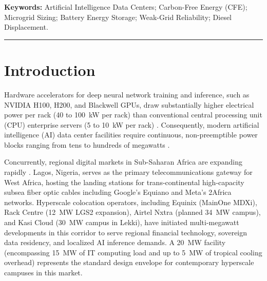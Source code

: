 \documentclass[11pt,a4paper]{article}
\begin{document}
\vspace{0.5em}
\noindent \textbf{Keywords:} Artificial Intelligence Data Centers; Carbon-Free Energy (CFE); Microgrid Sizing; Battery Energy Storage; Weak-Grid Reliability; Diesel Displacement.

\vspace{0.8em}
\noindent\rule{\textwidth}{0.4pt}

\section{Introduction}
\label{sec:intro}

Hardware accelerators for deep neural network training and inference, such as NVIDIA H100, H200, and Blackwell GPUs, draw substantially higher electrical power per rack (40 to 100~kW per rack) than conventional central processing unit (CPU) enterprise servers (5 to 10~kW per rack) \cite{Wu2022, Faiz2024}. Consequently, modern artificial intelligence (AI) data center facilities require continuous, non-preemptible power blocks ranging from tens to hundreds of megawatts \cite{AlTurjman2024, Narayanan2021}.

Concurrently, regional digital markets in Sub-Saharan Africa are expanding rapidly \cite{Mbate2024}. Lagos, Nigeria, serves as the primary telecommunications gateway for West Africa, hosting the landing stations for trans-continental high-capacity subsea fiber optic cables including Google's Equiano and Meta's 2Africa networks. Hyperscale colocation operators, including Equinix (MainOne MDXi), Rack Centre (12~MW LGS2 expansion), Airtel Nxtra (planned 34~MW campus), and Kasi Cloud (30~MW campus in Lekki), have initiated multi-megawatt developments in this corridor to serve regional financial technology, sovereign data residency, and localized AI inference demands. A 20~MW facility (encompassing 15~MW of IT computing load and up to 5~MW of tropical cooling overhead) represents the standard design envelope for contemporary hyperscale campuses in this market.
\end{document}

